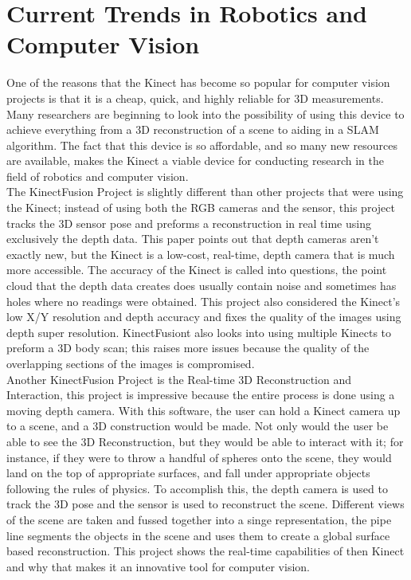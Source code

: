 \documentclass[12pt,twocolumn]{article}
\begin{document}
\section{Current Trends in Robotics and Computer Vision}
One of the reasons that the Kinect has become so popular for computer vision projects is that it is a cheap, quick, and highly reliable for 3D measurements. Many researchers are beginning to look into the possibility of using this device to achieve everything from a 3D reconstruction of a scene to aiding in a SLAM algorithm. The fact that this device is so affordable, and so many new resources are available, makes the Kinect a viable device for conducting research in the field of robotics and computer vision.\\
\indent The KinectFusion Project is slightly different than other projects that were using the Kinect; instead of using both the RGB cameras and the sensor, this project tracks the 3D sensor pose and preforms a reconstruction in real time using exclusively the depth data. This paper points out that depth cameras aren't exactly new, but the Kinect is a low-cost, real-time, depth camera that is much more accessible. The accuracy of the Kinect is called into questions, the point cloud that the depth data creates does usually contain noise and sometimes has holes where no readings were obtained. This project also considered the Kinect's low X/Y resolution and depth accuracy and fixes the quality of the images using depth super resolution. KinectFusiont also looks into using multiple Kinects to preform a 3D body scan; this raises more issues because the quality of the overlapping sections of the images is compromised. \\
\indent	Another KinectFusion Project is the Real-time 3D Reconstruction and Interaction, this project is impressive because the entire process is done using a moving depth camera. With this software, the user can hold a Kinect camera up to a scene, and a 3D construction would be made. Not only would the user be able to see the 3D Reconstruction, but they would be able to interact with it; for instance, if they were to throw a handful of spheres onto the scene, they would land on the top of appropriate surfaces, and fall under appropriate objects following the rules of physics. To accomplish this, the depth camera is used to track the 3D pose and the sensor is used to reconstruct the scene. Different views of the scene are taken and fussed together into a singe representation, the pipe line segments the objects in the scene and uses them to create a global surface based reconstruction. This project shows the real-time capabilities of then Kinect and why that makes it an innovative tool for computer vision.\\
\end{document}
